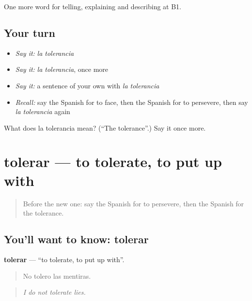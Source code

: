 \begin{grammarlens}[title={What you've built}]
One more word for telling, explaining and describing at B1.
\end{grammarlens}

\subsection*{Your turn}
\begin{itemize}
\raggedright
  \item \emph{Say it:} \emph{la tolerancia}
  \item \emph{Say it:} \emph{la tolerancia}, once more
  \item \emph{Say it:} a sentence of your own with \emph{la tolerancia}
  \item \emph{Recall:} say the Spanish for to face, then the Spanish for to persevere, then say \emph{la tolerancia} again
\end{itemize}

\begin{tcolorbox}[breakable,colback=teal!4,colframe=teal!35!black,title={Before you move on}]
What does la tolerancia mean? (\textquotedblleft{}The tolerance\textquotedblright{}.) Say it once more.
\end{tcolorbox}
\section[tolerar]{tolerar — to tolerate, to put up with}

\label{lesson:ES-C610-tolerar}



\begin{quote}
Before the new one: say the Spanish for to persevere, then the Spanish for the tolerance.
\end{quote}

\subsection*{You'll want to know: tolerar}
\textbf{tolerar} — \textquotedblleft{}to tolerate, to put up with\textquotedblright{}.

\begin{quote}
No tolero las mentiras.
\end{quote}

\begin{quote}
\emph{I do not tolerate lies.}
\end{quote}

